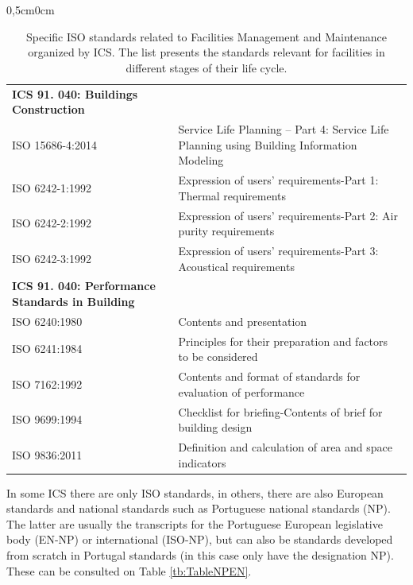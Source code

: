 \begin{landscape}
\begin{table}[h!]
\begin{adjustwidth}{0,5cm}{0cm}
{\begin{tabular}{ll}
				{\bf ICS 91. 040: Buildings Construction}  &  \\
				ISO 15686-4:2014 & Service Life Planning -- Part 4: Service Life Planning using Building Information Modeling \\		            
				ISO 6242-1:1992 & Expression of users' requirements-Part 1: Thermal requirements  \\		            
				ISO 6242-2:1992 & Expression of users' requirements-Part 2: Air purity requirements  \\		            
				ISO 6242-3:1992 & Expression of users' requirements-Part 3: Acoustical requirements \\
				\hline

				{\bf ICS 91. 040: Performance Standards in Building}  & \\
				ISO 6240:1980 & Contents and presentation  \\	            
				ISO 6241:1984 & Principles for their preparation and factors to be considered  \\		            
				ISO 7162:1992 & Contents and format of standards for evaluation of performance  \\		            
				ISO 9699:1994 & Checklist for briefing-Contents of brief for building design  \\			            
				ISO 9836:2011 & Definition and calculation of area and space indicators \\
				\hline

			\end{tabular}
			}
		\end{adjustwidth}
		\caption{Specific ISO standards related to Facilities Management and Maintenance organized by ICS. The list presents the standards relevant for facilities in different stages of their life cycle.}
		\label{tb:TableISO}
\end{table}
\end{landscape}
In some ICS there are only ISO standards, in others, there are also European standards and national standards such as Portuguese national standards (NP). The latter are usually the transcripts for the Portuguese European legislative body (EN-NP)  or international (ISO-NP), but can also be standards developed from scratch in Portugal standards (in this case only have the designation NP). These can be consulted on Table \ref{tb:TableNPEN}.

